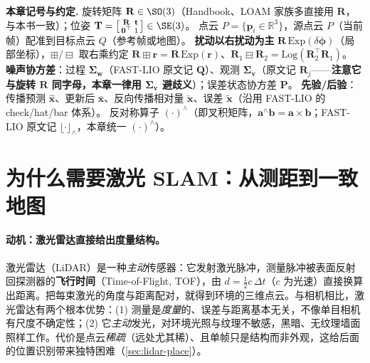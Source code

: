 \begin{note}
\textbf{本章记号与约定.}\;
旋转矩阵 $\mathbf{R}\in\SO(3)$（Handbook\cite{carlone2026handbook}、LOAM 家族多直接用 $\mathbf{R}$，与本书一致）；位姿 $\mathbf{T}=\big[\begin{smallmatrix}\mathbf{R}&\mathbf{t}\\\mathbf{0}^\top&1\end{smallmatrix}\big]\in\SE(3)$。
点云 $P=\{\mathbf{p}_i\in\mathbb{R}^3\}$，源点云 $P$（当前帧）配准到目标点云 $Q$（参考帧或地图）。
\textbf{扰动以右扰动为主} $\mathbf{R}\,\mathrm{Exp}(\delta\boldsymbol{\phi})$（局部坐标），$\boxplus/\boxminus$ 取右乘约定 $\mathbf{R}\boxplus\mathbf{r}=\mathbf{R}\,\mathrm{Exp}(\mathbf{r})$、$\mathbf{R}_1\boxminus\mathbf{R}_2=\mathrm{Log}(\mathbf{R}_2^\top\mathbf{R}_1)$。
\textbf{噪声协方差}：过程 $\boldsymbol{\Sigma}_{\mathbf{w}}$（FAST-LIO 原文记 $\mathbf{Q}$）、观测 $\boldsymbol{\Sigma}_{\mathbf{v}}$（原文记 $\mathbf{R}_j$——\textbf{注意它与旋转 $\mathbf{R}$ 同字母，本章一律用 $\boldsymbol{\Sigma}_{\mathbf{v}}$ 避歧义}）；误差状态协方差 $\mathbf{P}$。
\textbf{先验/后验}：传播预测 $\hat{\mathbf{x}}$、更新后 $\bar{\mathbf{x}}$、反向传播相对量 $\check{\mathbf{x}}$、误差 $\tilde{\mathbf{x}}$（沿用 FAST-LIO 的 check/hat/bar 体系）。
反对称算子 $(\cdot)^\wedge$（即叉积矩阵，$\mathbf{a}^\wedge\mathbf{b}=\mathbf{a}\times\mathbf{b}$；FAST-LIO 原文记 $\lfloor\cdot\rfloor_\wedge$，本章统一 $(\cdot)^\wedge$）。
\end{note}

\section{为什么需要激光 SLAM：从测距到一致地图}
\label{sec:lidar-why}

\paragraph{动机：激光雷达直接给出度量结构。}
激光雷达（LiDAR）是一种\emph{主动}传感器：它发射激光脉冲，测量脉冲被表面反射回探测器的\textbf{飞行时间}（Time-of-Flight, TOF），由 $d=\tfrac12 c\,\Delta t$（$c$ 为光速）直接换算出距离\cite{carlone2026handbook}。把每束激光的角度与距离配对，就得到环境的三维点云。与相机相比，激光雷达有两个根本优势：(1) 测量是\emph{度量}的、误差与距离基本无关，不像单目相机有尺度不确定性；(2) 它\emph{主动}发光，对环境光照与纹理不敏感，黑暗、无纹理墙面照样工作。代价是点云\emph{稀疏}（远处尤其稀）、且单帧只是结构而非外观，这给后面的位置识别带来独特困难（\cref{sec:lidar-place}）。

